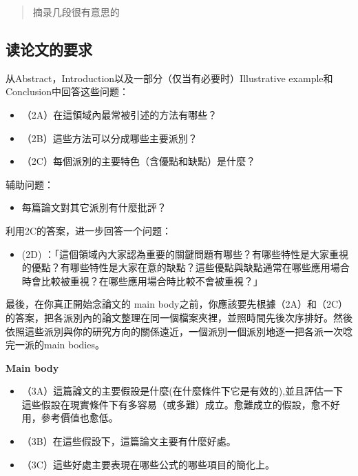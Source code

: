 \documentclass[
]{book}
\providecommand{\tightlist}{%
  \setlength{\itemsep}{0pt}\setlength{\parskip}{0pt}}
\theoremstyle{definition}
\theoremstyle{definition}
\theoremstyle{definition}
\theoremstyle{remark}
\begin{document}
\begin{quote}
摘录几段很有意思的
\end{quote}

\hypertarget{ux8bfbux8bbaux6587ux7684ux8981ux6c42}{%
\subsection{读论文的要求}\label{ux8bfbux8bbaux6587ux7684ux8981ux6c42}}

从Abstract，Introduction以及一部分（仅当有必要时）Illustrative example和Conclusion中回答这些问题：

\begin{itemize}
\tightlist
\item
  （2A）在這領域內最常被引述的方法有哪些？
\item
  （2B）這些方法可以分成哪些主要派別？
\item
  （2C）每個派別的主要特色（含優點和缺點）是什麼？
\end{itemize}

辅助问题：

\begin{itemize}
\tightlist
\item
  每篇論文對其它派別有什麼批評？
\end{itemize}

利用2C的答案，进一步回答一个问题：

\begin{itemize}
\tightlist
\item
  (2D) ：「這個領域內大家認為重要的關鍵問題有哪些？有哪些特性是大家重視的優點？有哪些特性是大家在意的缺點？這些優點與缺點通常在哪些應用場合時會比較被重視？在哪些應用場合時比較不會被重視？」
\end{itemize}

最後，在你真正開始念論文的 main body之前，你應該要先根據（2A）和（2C）的答案，把各派別內的論文整理在同㆒個檔案夾裡，並照時間先後次序排好。然後依照這些派別與你的研究方向的關係遠近，㆒個派別㆒個派別㆞逐㆒把各派㆒次唸完㆒派的main bodies。

\textbf{Main body}

\begin{itemize}
\tightlist
\item
  （3A）這篇論文的主要假設是什麼(在什麼條件㆘它是有效的),並且評估㆒㆘這些假設在現實條件㆘有多容易（或多難）成立。愈難成立的假設，愈不好用，參考價值也愈低。
\item
  （3B）在這些假設㆘，這篇論文主要有什麼好處。
\item
  （3C）這些好處主要表現在哪些公式的哪些項目的簡化㆖。
\end{itemize}
\end{document}
